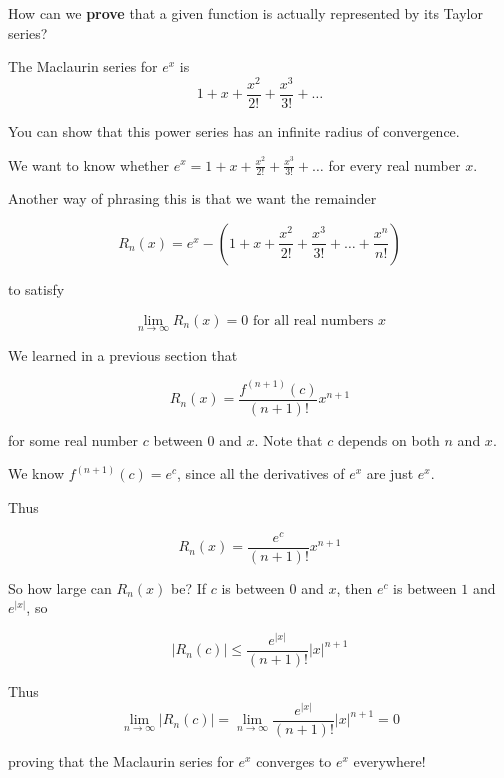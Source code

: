 \documentclass{ximera}
\begin{document}
How can we \textbf{prove} that a given function is actually represented by its Taylor series?

\begin{example}
	The Maclaurin series for $e^x$ is 
	\[
	1+x+\frac{x^2}{2!} +\frac{x^3}{3!}+\dots
	\]
	
	You can show that this power series has an infinite radius of convergence.
	
	We want to know whether $e^x = 1+x+\frac{x^2}{2!} +\frac{x^3}{3!}+\dots$ for every real number $x$.
	
	Another way of phrasing this is that we want the remainder
	
	\[
	R_n(x) = e^x - (1+x+\frac{x^2}{2!} +\frac{x^3}{3!}+\dots+\frac{x^{n}}{n!})
	\]
	
	to satisfy 
	
	\[
	\lim_{n \to \infty} R_n(x) = 0 \textrm{ for all real numbers $x$} 
	\]
	
	We learned in a previous section that
	
	\[
	R_n(x) = \frac{f^{(n+1)}(c)}{(n+1)!}x^{n+1}
	\]
	
	for some real number $c$ between $0$ and $x$.  Note that $c$ depends on  both $n$ and $x$.
	
	  We know $f^{(n+1)}(c) = e^c$, since all the derivatives of $e^x$ are just $e^x$.
	
	Thus 
	
	\[
	R_n(x) = \frac{e^c}{(n+1)!}x^{n+1}
	\]
	
	So how large can $R_n(x)$ be?  If $c$ is between $0$ and $x$, then  $e^c$ is between $1$ and $e^{|x|}$, so
	
	\[
	\left| R_n(c)\right| \leq \frac{e^{|x|}}{(n+1)!}|x|^{n+1}
	\]
	
	Thus 
	\[
	\lim_{n \to \infty}\left| R_n(c)\right| = \lim_{n \to \infty} \frac{e^{|x|}}{(n+1)!}|x|^{n+1} = 0
	\]
	
	proving that the Maclaurin series for $e^x$ converges to $e^x$ everywhere!
	

\end{example}
\end{document}
